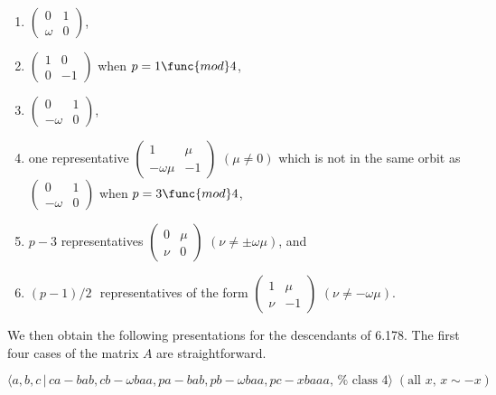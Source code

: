 \documentclass[10pt]{article}
\begin{document}
\begin{enumerate}
\item $\left( 
\begin{array}{ll}
0 & 1 \\ 
\omega & 0%
\end{array}%
\right) $,

\item $\left( 
\begin{array}{ll}
1 & 0 \\ 
0 & -1%
\end{array}%
\right) $ when $p=1\func{mod}4$,

\item $\left( 
\begin{array}{ll}
0 & 1 \\ 
-\omega & 0%
\end{array}%
\right) $,

\item one representative $\left( 
\begin{array}{ll}
1 & \mu \\ 
-\omega \mu & -1%
\end{array}%
\right) $ $(\mu \neq 0)$ which is not in the same orbit as $\left( 
\begin{array}{ll}
0 & 1 \\ 
-\omega & 0%
\end{array}%
\right) $ when $p=3\func{mod}4$,

\item $p-3$ representatives $\left( 
\begin{array}{ll}
0 & \mu \\ 
\nu & 0%
\end{array}%
\right) $ $(\nu \neq \pm \omega \mu )$, and

\item $(p-1)/2\,$\ representatives of the form $\left( 
\begin{array}{ll}
1 & \mu \\ 
\nu & -1%
\end{array}%
\right) $ $(\nu \neq -\omega \mu )$.
\end{enumerate}

We then obtain the following presentations for the descendants of 6.178. The
first four cases of the matrix $A$ are straightforward.

\begin{equation}
\langle a,b,c\,|\,ca-bab,cb-\omega baa,pa-bab,pb-\omega baa,pc-xbaaa,\,\text{%
class }4\rangle \;(\text{all }x,\,x\sim -x)  \tag{7.1794}
\end{equation}
\end{document}
